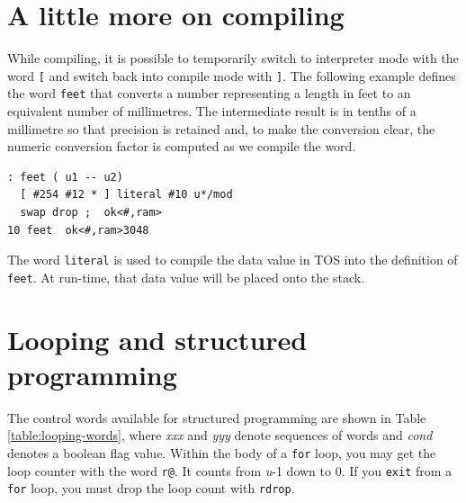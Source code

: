 \documentclass[12pt,a4paper]{article}
\begin{document}
\bigskip
\section{A little more on compiling}
\label{sec:compile-mode}
%
While compiling, it is possible to temporarily switch to interpreter mode
with the word \verb![! and switch back into compile mode with \verb!]!.
The following example defines the word \verb!feet! that converts a number
representing a length in feet to an equivalent number of millimetres.
The intermediate result is in tenths of a millimetre so that precision is retained and,
to make the conversion clear, the numeric conversion factor is computed
as we compile the word.
\begin{verbatim}
: feet ( u1 -- u2) 
  [ #254 #12 * ] literal #10 u*/mod 
  swap drop ;  ok<#,ram>
10 feet  ok<#,ram>3048 
\end{verbatim}
The word \verb!literal! is used to compile the data value in TOS 
into the definition of \verb!feet!.
At run-time, that data value will be placed onto the stack.


\bigskip
\section{Looping and structured programming}
\label{sec:looping}
%
The control words available for structured programming are shown in Table\,\ref{table:looping-words},
where \textit{xxx} and \textit{yyy} denote sequences of words and 
\textit{cond} denotes a boolean flag value.
Within the body of a \verb!for! loop, you may get the loop counter with the word \verb!r@!.
It counts from \textit{u}-1 down to 0.
If you \verb!exit! from a \verb!for! loop, you must drop the loop count with \verb!rdrop!.
\end{document}
